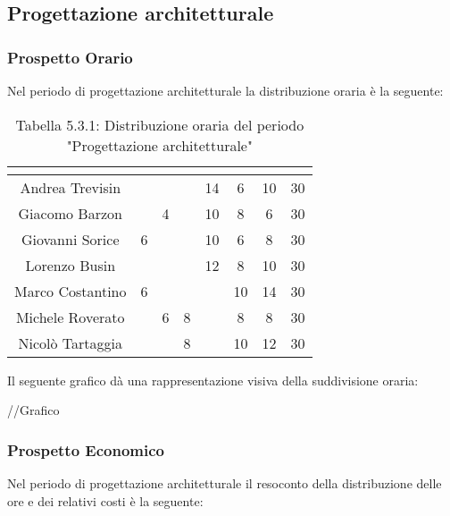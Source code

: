 \subsection{Progettazione architetturale}

\subsubsection{Prospetto Orario}
Nel periodo di progettazione architetturale la distribuzione oraria è la seguente:

\renewcommand{\arraystretch}{1.5}
\begin{table}[H]
\begin{center}
\begin{tabular}{|c|c|c|c|c|c|c|c|}
\hline
\rowcolor{title_row}
\textbf{\color{title_text}{Nome}} & \textbf{\color{title_text}{Resp.}} & \textbf{\color{title_text}{Ammi.}} & \textbf{\color{title_text}{Analist.}} & \textbf{\color{title_text}{Progett.}} & \textbf{\color{title_text}{Program.}} & \textbf{\color{title_text}{Verific.}} & \textbf{\color{title_text}{Totale}} \\ \hline
Andrea Trevisin  & & & & 14 & 6 & 10 & 30 \\ \hline
Giacomo Barzon   &  & 4 &  & 10 & 8 & 6 & 30\\ \hline
Giovanni Sorice  & 6 &  &  & 10 & 6 & 8 & 30\\ \hline
Lorenzo Busin    &  &  &  & 12 & 8 & 10 & 30\\ \hline
Marco Costantino & 6 &  &  &  & 10 & 14 & 30\\ \hline
Michele Roverato &  & 6 & 8 &  & 8 & 8 & 30\\ \hline
Nicolò Tartaggia &  &  & 8 &  & 10 & 12 & 30\\ \hline
\end{tabular}
\caption{Tabella 5.3.1: Distribuzione oraria del periodo "Progettazione architetturale"\label{}}
\end{center}
\end{table}
\renewcommand{\arraystretch}{1}

Il seguente grafico dà una rappresentazione visiva della suddivisione oraria: \\
\begin{center}
//Grafico
\end{center}


\subsubsection{Prospetto Economico}
Nel periodo di progettazione architetturale il resoconto della distribuzione delle ore e dei relativi costi è la seguente:

